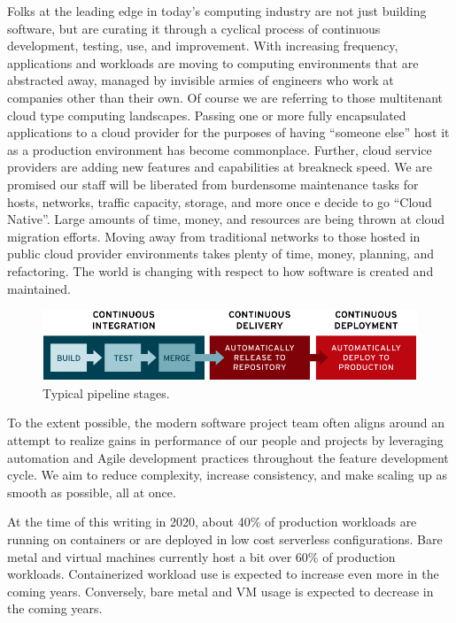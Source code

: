 \justify{}
Folks at the leading edge in today's computing industry are not just building
software, but are curating it through a cyclical process of continuous development,
testing, use, and improvement. With increasing frequency, applications and
workloads are moving to computing environments that are abstracted away, managed
by invisible armies of engineers who work at companies other than their own. Of course
we are referring to those multitenant cloud type computing landscapes. Passing
one or more fully encapsulated applications to a cloud provider for the purposes
of having ``someone else'' host it as a production environment has become
commonplace. Further, cloud service providers are adding new features and capabilities
at breakneck speed. We are promised our staff will be liberated from burdensome
maintenance tasks for hosts, networks, traffic capacity, storage, and more once
e decide to go ``Cloud Native''. Large amounts of time,
money, and resources are being thrown at cloud migration efforts. Moving away
from traditional networks to those hosted in public
cloud provider environments takes plenty of time, money, planning, and refactoring.
The world is changing with respect to how software is created and maintained.

\begin{figure}[!htb]
	\centering
	\includegraphics[scale=0.35]{../images/ci-cd-flow-desktop_0.png}
	\caption{Typical pipeline stages.}
\label{stages}
\end{figure}

\justify{}
To the extent possible, the modern software project team often aligns around an
attempt to realize gains in performance of our people and projects by
leveraging automation and Agile development practices throughout the
feature development cycle. We aim to reduce complexity, increase consistency, and make
scaling up as smooth as possible, all at once.

\justify{}
At the time of this writing in 2020, about 40\% of production workloads are
running on containers or are deployed in low cost serverless configurations.
Bare metal and virtual machines currently host a bit over 60\% of production
workloads. Containerized workload use is expected to increase even more in
the coming years. Conversely, bare metal and VM usage is expected to
decrease in the coming years.\cite{cnative}

